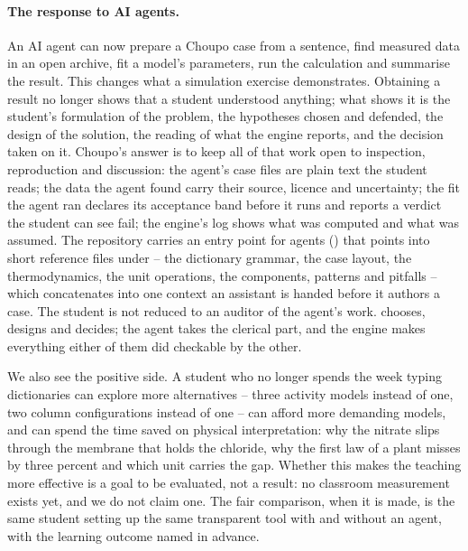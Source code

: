 \documentclass[11pt,a4paper]{article}
\newcommand{\code}[1]{\texttt{\detokenize{#1}}}
\begin{document}
\paragraph{The response to AI agents.}  An AI agent can now prepare a
Choupo case from a sentence, find measured data in an open archive, fit a
model's parameters, run the calculation and summarise the result.  This
changes what a simulation exercise demonstrates.  Obtaining a result no
longer shows that a student understood anything; what shows it is the
student's formulation of the problem, the hypotheses chosen and defended,
the design of the solution, the reading of what the engine reports, and the
decision taken on it.  Choupo's answer is to keep all of that work open to
inspection, reproduction and discussion: the agent's case files are plain
text the student reads; the data the agent found carry their source,
licence and uncertainty; the fit the agent ran declares its acceptance band
before it runs and reports a verdict the student can see fail; the engine's
log shows what was computed and what was assumed.  The repository carries
an entry point for agents (\code{AGENTS.md}) that points into short
reference files under \code{docs/ai/} -- the dictionary grammar, the case
layout, the thermodynamics, the unit operations, the components, patterns
and pitfalls -- which \code{bin/llmctx} concatenates into one context an
assistant is handed before it authors a case.  The student is not
reduced to an auditor of the agent's work.
chooses, designs and decides; the agent takes the clerical part, and the
engine makes everything either of them did checkable by the other.

We also see the positive side.  A student who no longer spends the week
typing dictionaries can explore more alternatives -- three activity models
instead of one, two column configurations instead of one -- can afford more
demanding models, and can spend the time saved on physical interpretation:
why the nitrate slips through the membrane that holds the chloride, why the
first law of a plant misses by three percent and which unit carries the
gap.  Whether this makes the teaching more effective is a goal to be
evaluated, not a result: no classroom measurement exists yet, and we do not
claim one.  The fair comparison, when it is made, is the same student
setting up the same transparent tool with and without an agent, with the
learning outcome named in advance.
\end{document}
